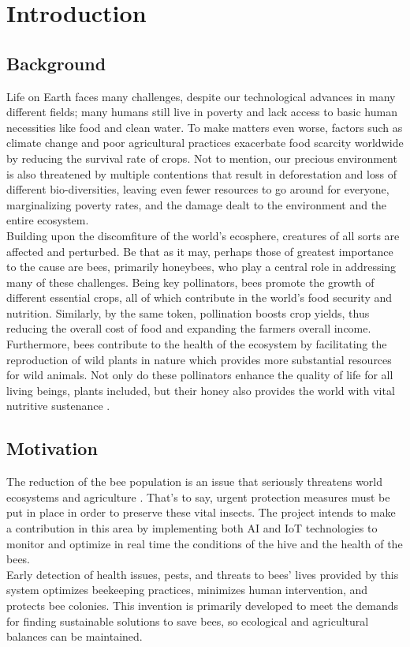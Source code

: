\documentclass[12pt]{article}
\begin{document}
	\section{Introduction}
	
	\subsection{Background} 
	Life on Earth faces many challenges, despite our technological advances in many different fields; many humans still live in poverty and lack access to basic human necessities like food and clean water. To make matters even worse, factors such as climate change and poor agricultural practices exacerbate food scarcity worldwide by reducing the survival rate of crops. 
	Not to mention, our precious environment is also threatened by multiple contentions that result in deforestation and loss of different bio-diversities, leaving even fewer resources to go around for everyone, marginalizing poverty rates, and the damage dealt to the environment and the entire ecosystem. \\ \newline
	Building upon the discomfiture of the world's ecosphere, creatures of all sorts are affected and perturbed.
	Be that as it may, perhaps those of greatest importance to the cause are bees, primarily honeybees, who play a central role in addressing many of these challenges. Being key pollinators, bees promote the growth of different essential crops, all of which contribute in the world's food security and nutrition. Similarly, by the same token, pollination boosts crop yields, thus reducing the overall cost of food and expanding the farmers overall income. Furthermore, bees contribute to the health of the ecosystem by facilitating the reproduction of wild plants in nature which provides more substantial resources for wild animals. Not only do these pollinators enhance the quality of life for all living beings, plants included, but their honey also provides the world with vital nutritive sustenance \cite{hristov2020significance}.
	
	\subsection{Motivation}
	The reduction of the bee population is an issue that seriously threatens world ecosystems and agriculture . That's to say, urgent protection measures must be put in place in order to preserve these vital insects. The project intends to make a contribution in this area by implementing both AI and IoT technologies to monitor and optimize in real time the conditions of the hive and the health of the bees.\\ \newline
	Early detection of health issues, pests, and threats to bees' lives provided by this system optimizes beekeeping practices, minimizes human intervention, and protects bee colonies. This invention is primarily developed to meet the demands for finding sustainable solutions to save bees, so ecological and agricultural balances can be maintained.
	\vspace{0.5 cm}
\end{document}
